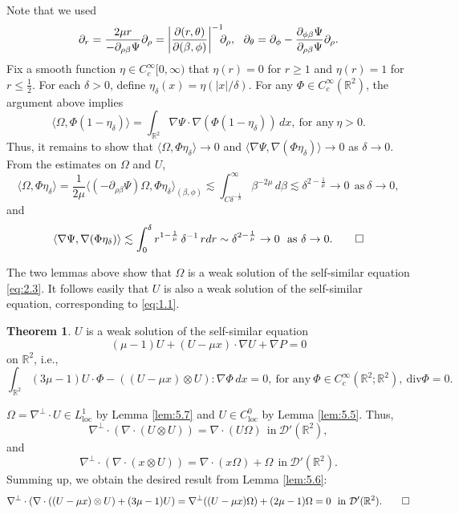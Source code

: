 \documentclass[11pt]{article}
\makeatletter
\renewenvironment{proof}[1][\proofname]{\par
  \vspace{-.7\topsep}%
  \pushQED{\qed}%
  \normalfont
  \topsep0pt \partopsep0pt %
  \trivlist
  \item[\hskip\labelsep
        \itshape
    #1\@addpunct{.}]\ignorespaces
}{%
  \popQED\endtrivlist\@endpefalse
  \addvspace{6pt plus 6pt} %
}
\theoremstyle{definition}
\newtheorem{theorem}{Theorem}[section]
\theoremstyle{remark}
\numberwithin{equation}{section}
\newcommand{\mbb}{\mathbb}
\newcommand{\mcal}{\mathcal}
\newcommand{\R}{\mbb{R}}
\newcommand{\del}{\partial}
\newcommand{\grad}{\nabla}
\newcommand{\abs}[1]{\left\lvert #1 \right\rvert}
\makeatother
\begin{document}
\begin{proof}
{\begin{align*}
\end{align*}}
Note that we used
\[\del_r = \frac{2\mu r}{-\del_{\rho\beta}\Psi} \del_\rho = \abs{\frac{\del(r,\theta)}{\del(\beta,\phi)}}^{-1} \hspace{-.5em} \del_\rho, ~~ \del_\theta = \del_\phi - \frac{\del_{\phi\beta}\Psi}{\del_{\rho\beta}\Psi} \del_\rho.\]
Fix a smooth function $\eta \in C^\infty_c[0,\infty)$ that $\eta(r) = 0$ for $r\geq 1$ and $\eta(r) = 1$ for $r \leq \frac{1}{2}$. For each $\delta>0$, define $\eta_\delta(x) = \eta(|x|/\delta)$. For any $\Phi\in C^\infty_c(\R^2)$, the argument above implies
\[\langle \Omega, \Phi (1-\eta_\delta) \rangle = \int_{\R^2} \grad \Psi \cdot \grad (\Phi(1-\eta_\delta)) \,dx, ~\text{for any}~\eta > 0.\]
Thus, it remains to show that $\langle \Omega, \Phi \eta_\delta \rangle \to 0$ and $\langle \grad \Psi, \grad(\Phi\eta_\delta) \rangle \to 0$ as $\delta \to 0$. From the estimates on $\Omega$ and $U$,
\[\langle \Omega, \Phi \eta_\delta \rangle = \frac{1}{2\mu} \langle (-\del_{\rho\beta} \Psi) \Omega, \Phi \eta_\delta \rangle_{(\beta,\phi)} \lesssim \int_{C \delta^{-\frac{1}{\mu}}}^\infty \beta^{-2\mu} \,d\beta \lesssim \delta^{2 - \frac{1}{\mu}} \to 0 ~~\text{as}~ \delta \to 0,\]
and
\[\langle \grad \Psi, \grad(\Phi \eta_\delta) \rangle \lesssim \int_0^\delta r^{1 - \frac{1}{\mu}} \, \delta^{-1} \, rdr \sim \delta^{2 - \frac{1}{\mu}} \to 0 ~~\text{as}~ \delta \to 0. \qedhere\]
\end{proof}

The two lemmas above show that $\Omega$ is a weak solution of the self-similar equation \eqref{eq:2.3}. It follows easily that $U$ is also a weak solution of the self-similar equation, corresponding to \eqref{eq:1.1}.

\begin{theorem} \label{thm:5.8} $U$ is a weak solution of the self-similar equation
\begin{equation*}
  (\mu - 1) U + (U - \mu x) \cdot \grad U + \grad P = 0
\end{equation*}
on $\R^2$, i.e.,
\begin{equation*}
  \int_{\R^2} (3\mu - 1) U \cdot \Phi  - ((U-\mu x) \otimes U) : \grad \Phi \,dx = 0, ~\text{for any}~\Phi \in C^\infty_c(\R^2 ; \R^2),~ \text{div} \Phi = 0.
\end{equation*}
\end{theorem}
\begin{proof}
$\Omega = \grad^\perp \cdot U\in L^1_{\text{loc}}$ by Lemma \ref{lem:5.7} and $U\in C^0_{\text{loc}}$ by Lemma \ref{lem:5.5}. Thus,
\[\grad^\perp \cdot (\grad \cdot (U\otimes U)) = \grad \cdot (U\Omega)~~\text{in}~\mcal{D}'(\R^2),\]
and
\[\grad^\perp \cdot (\grad \cdot (x \otimes U)) = \grad \cdot (x\Omega) + \Omega ~~\text{in}~\mcal{D}'(\R^2).\]
Summing up, we obtain the desired result from Lemma \ref{lem:5.6}:
\[\grad^\perp \cdot(\grad\cdot((U-\mu x)\otimes U) + (3\mu - 1) U) = \grad^\perp((U-\mu x) \Omega) + (2\mu - 1)\Omega = 0 ~~\text{in}~\mcal{D}'(\R^2). \qedhere\]
\end{proof}
\end{document}
